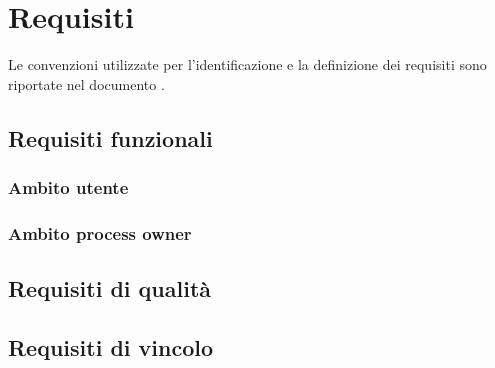 \section{Requisiti}
Le convenzioni utilizzate per l'identificazione e la definizione dei requisiti sono riportate nel documento \NormeDiProgetto{}. 
\subsection{Requisiti funzionali}
\subsubsection{Ambito utente}
\subsubsection{Ambito process owner}
\subsection{Requisiti di qualità}
\subsection{Requisiti di vincolo}
